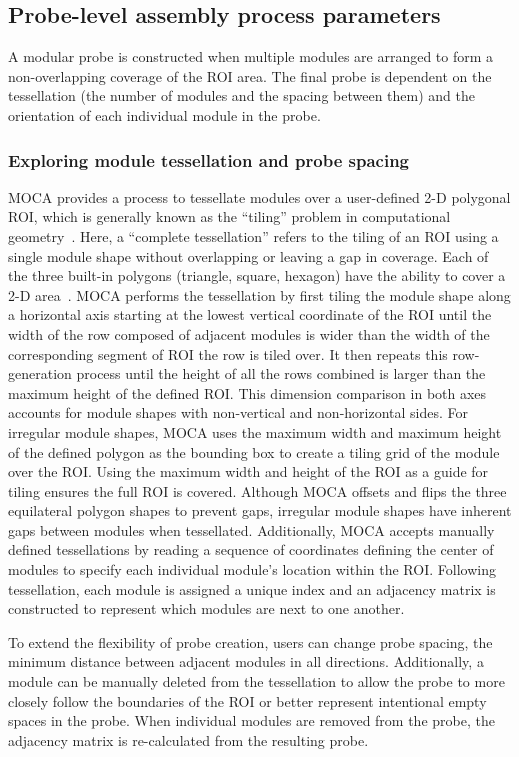 \subsection{Probe-level assembly process parameters}
A modular probe is constructed when multiple modules are arranged to form a non-overlapping coverage of the ROI area. The final probe is dependent on the tessellation (the number of modules and the spacing between them) and the orientation of each individual module in the probe.

\subsubsection{Exploring module tessellation and probe spacing}
MOCA provides a process to tessellate modules over a user-defined 2-D polygonal ROI, which is generally known as the ``tiling'' problem in computational geometry~\cite{Winslow2015}. Here, a ``complete tessellation'' refers to the tiling of an ROI using a single module shape without overlapping or leaving a gap in coverage. Each of the three built-in polygons (triangle, square, hexagon) have the ability to cover a 2-D area~\cite{Samet1990}. MOCA performs the tessellation by first tiling the module shape along a horizontal axis starting at the lowest vertical coordinate of the ROI until the width of the row composed of adjacent modules is wider than the width of the corresponding segment of ROI the row is tiled over. It then repeats this row-generation process until the height of all the rows combined is larger than the maximum height of the defined ROI. This dimension comparison in both axes accounts for module shapes with non-vertical and non-horizontal sides. For irregular module shapes, MOCA uses the maximum width and maximum height of the defined polygon as the bounding box to create a tiling grid of the module over the ROI. Using the maximum width and height of the ROI as a guide for tiling ensures the full ROI is covered. Although MOCA offsets and flips the three equilateral polygon shapes to prevent gaps, irregular module shapes have inherent gaps between modules when tessellated. Additionally, MOCA accepts manually defined tessellations by reading a sequence of coordinates defining the center of modules to specify each individual module's location within the ROI. Following tessellation, each module is assigned a unique index and an adjacency matrix is constructed to represent which modules are next to one another.

To extend the flexibility of probe creation, users can change probe spacing, the minimum distance between adjacent modules in all directions. Additionally, a module can be manually deleted from the tessellation to allow the probe to more closely follow the boundaries of the ROI or better represent intentional empty spaces in the probe. When individual modules are removed from the probe, the adjacency matrix is re-calculated from the resulting probe. 

